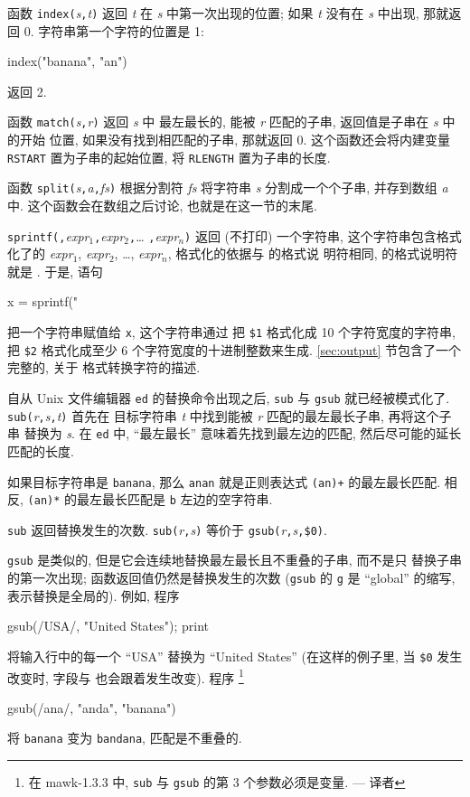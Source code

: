 函数 \verb'index('\textit{s}\verb','\textit{t}\verb')' 返回 \textit{t} 在
\textit{s} 中第一次出现的位置; 如果 \textit{t} 没有在 \textit{s} 中出现,
那就返回 0. 字符串第一个字符的位置是 1:
\begin{awkcode}
    index("banana", "an")
\end{awkcode}
返回 2.

函数 \verb'match('\textit{s}\verb','\textit{r}\verb')' 返回 \textit{s} 中
最左最长的, 能被 \textit{r} 匹配的子串, 返回值是子串在 \textit{s} 中的开始
位置, 如果没有找到相匹配的子串, 那就返回 0. 这个函数还会将内建变量
\verb'RSTART' 置为子串的起始位置, 将 \verb'RLENGTH' 置为子串的长度.

函数 \verb'split('\textit{s}\verb','\textit{a}\verb','\textit{fs}\verb')'
根据分割符 \textit{fs} 将字符串 \textit{s} 分割成一个个子串, 并存到数组
\textit{a} 中. 这个函数会在数组之后讨论, 也就是在这一节的末尾.

\verb'sprintf('\fmt\verb','\textit{expr}$_1$\verb','\textit{expr}$_2$\verb','\ldots%
\verb','\textit{expr}$_n$\verb')' 返回 (不打印) 一个字符串,
这个字符串包含格式%
化了的
\textit{expr}$_1$, \textit{expr}$_2$, \ldots, \textit{expr}$_n$,
格式化的依据与 \printf 的格式说
明符相同, \printf 的格式说明符就是 \fmt. 于是, 语句
\begin{awkcode}
    x = sprintf("%
\end{awkcode}
把一个字符串赋值给 \verb'x', 这个字符串通过%
把 \verb'$1' 格式化成 10 个字符宽度的字符串, 把 \verb'$2' 格式化成至少 6
个字符宽度的十进制整数来生成. \ref{sec:output} 节包含了一个完整的, 关于
格式转换字符的描述.

自从 Unix 文件编辑器 \verb'ed' 的替换命令出现之后, \verb'sub' 与
\verb'gsub' 就已经被模式化了.
\verb'sub('\textit{r}\verb','\textit{s}\verb','\textit{t}\verb')' 首先在
目标字符串 \textit{t} 中找到能被 \textit{r} 匹配的最左最长子串,
再将这个子串
替换为 \textit{s}. 在 \verb'ed' 中, ``最左最长'' 意味着先找到最左边的匹配,
然后尽可能的延长匹配的长度.

如果目标字符串是 \verb'banana', 那么 \verb'anan' 就是正则表达式
\verb'(an)+' 的最左最长匹配. 相反, \verb'(an)*' 的最左最长匹配是 \verb'b'
左边的空字符串.

\verb'sub' 返回替换发生的次数.
\verb'sub('\textit{r}\verb','\textit{s}\verb')' 等价于
\verb'gsub('\textit{r}\verb','\textit{s}\verb','\verb'$0'\verb')'.

\verb'gsub' 是类似的, 但是它会连续地替换最左最长且不重叠的子串, 而不是只
替换子串的第一次出现; 函数返回值仍然是替换发生的次数
(\verb'gsub' 的 \verb'g' 是 ``global'' 的缩写, 表示替换是全局的). 例如,
程序
\begin{awkcode}
    { gsub(/USA/, "United States"); print }
\end{awkcode}
将输入行中的每一个 ``USA'' 替换为 ``United States'' (在这样的例子里,
当 \verb'$0' 发生改变时, 字段与 \nf 也会跟着发生改变). 程序
\footnote{在 mawk-1.3.3 中, \texttt{sub} 与 \texttt{gsub}
的第 3 个参数必须是变量. --- 译者}
\begin{awkcode}
    gsub(/ana/, "anda", "banana")
\end{awkcode}
将 \verb'banana' 变为 \verb'bandana', 匹配是不重叠的.

